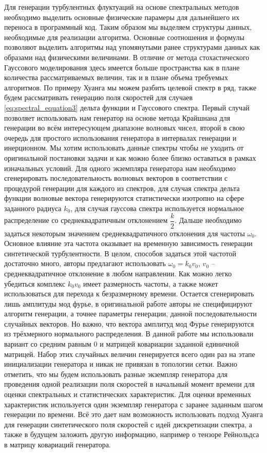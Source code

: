 Для генерации турбулентных флуктуаций на основе спектральных методов необходимо выделить основные физические парамеры для дальнейшего их переноса в программный код. Таким образом мы выделяем структуры данных, необходимые для реализации алгоритма. Основные соотношения и формулы позволяют выделить алгоритмы над упомянутыми ранее структурами данных как образами над физическими величинами. В отличие от метода стохастического Гауссового моделирования здесь имеется больше пространства как в плане количества рассматриваемых величин, так и в плане объема требуемых алгоритмов. По примеру Хуанга мы можем разбить целевой спектр в ряд, также будем рассматривать генерацию поля скоростей для случаев \ref{eq:spectral_equation3} дельта функции и Гауссового спектра. Первый случай позволяет использовать нам генератор на основе метода Крайшнана для генерации во всём интересующем диапазоне волновых чисел, второй в свою очередь для простого использования генератора в интервалах генерации и инерционном. Мы хотим использовать данные спектры чтобы не уходить от оригинальной постановки задачи и как можно более близко оставаться в рамках изначальных условий. Для одного экземпляра генератора нам необходимо сгенерировать последовательность волновых векторов в соответствии с процедурой генерации для каждого из спектров, для случая спектра дельта функции волновые вектора генерируются статистически изотропно на сфере заданного радиуса $k_0$, для случая гауссова спектра используется нормальное распределение со среднеквадратичным отклонением $\dfrac{k}{2}$. Дальше необходимо задаться некоторым значением среднеквадратичного отклонения для частоты $\omega_0$. Основное влияние эта частота оказывает на временную зависимость генерации синтетической турбулентности. В целом, способов задаться этой частотой достаточно много, авторы предлагают использовать $\omega_0 = k_0 v_0$, $v_0$ -- среднеквадратичное отклонение в любом направлении. Как можно легко убедиться комплекс $k_0 v_0$ имеет размерность частоты, а также может использоваться для перехода к безразмерному времени. Остается сгенерировать лишь амплитуды мод фурье, в оригинальной работе авторы не специфицируют алгоритм генерации, а точнее параметры генерации, данной последовательности случайных векторов. Но важно, что вектора амплитуд мод Фурье генерируются из трёхмерного нормального распределения. В данной работе мы использовали вариант со средним равным 0 и матрицей ковариации заданной единичной матрицей. Набор этих случайных величин генерируется всего один раз на этапе инициализации генератора и никак не привязан в топологии сетки. Важно отметить, что мы будем использовать разные экземпляр генератора для проведения одной реализации поля скоростей в начальный момент времени для оценки спектральных и статистических характеристик. Для оценки временных характеристик используется один экземпляр генератора с заранее заданным шагом генерации по времени. 
Всё это дает нам возможность использовать подход Хуанга для генерации синтетического поля скоростей с идей дискретизации спектра, а также в будущем заложить другую информацию, например о тензоре Рейнольдса в матрицу ковариаций генератора. 

